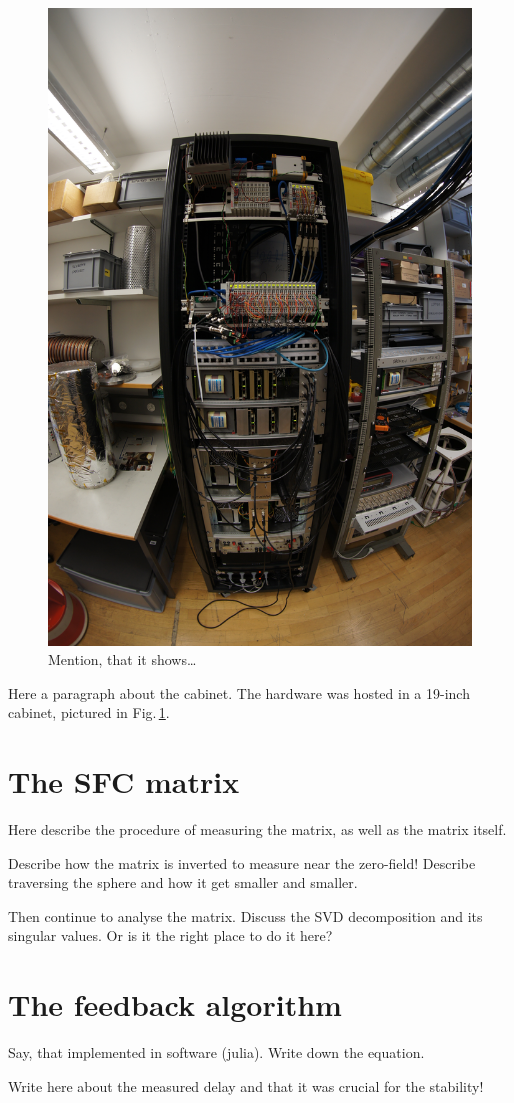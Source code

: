 \begin{figure}
  \centering
  \includegraphics[width=0.6\linewidth,angle=90]{gfx/prototype/DSC03477.JPG}
  \caption{Mention, that it shows\ldots}
  \label{fig:prototype_photo_daq}
\end{figure}

Here a paragraph about the cabinet. The hardware was hosted in a 19-inch cabinet, pictured in Fig.\,\ref{fig:prototype_photo_daq}.


\section{The SFC matrix}
Here describe the procedure of measuring the matrix, as well as the matrix itself.

Describe how the matrix is inverted to measure near the zero-field! Describe traversing the sphere and how it get smaller and smaller.

Then continue to analyse the matrix. Discuss the SVD decomposition and its singular values. Or is it the right place to do it here?


\section{The feedback algorithm}
Say, that implemented in software (julia). Write down the equation.

Write here about the measured delay and that it was crucial for the stability!


